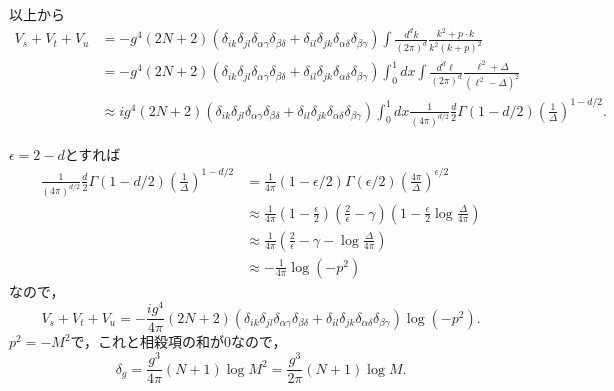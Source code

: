 以上から
\begin{align*}
  V_s + V_t + V_u &= - g^4 (2N+2) \left( \delta_{ik} \delta_{jl} \delta_{\alpha\gamma} \delta_{\beta\delta} + \delta_{il} \delta_{jk} \delta_{\alpha\delta} \delta_{\beta\gamma} \right)
  \int \frac{d^dk}{(2\pi)^d} \frac{k^2 + p \cdot k}{k^2(k+p)^2} \\
  &= - g^4 (2N+2) \left( \delta_{ik} \delta_{jl} \delta_{\alpha\gamma} \delta_{\beta\delta} + \delta_{il} \delta_{jk} \delta_{\alpha\delta} \delta_{\beta\gamma} \right)
  \int_0^1 dx \int \frac{d^d\ell}{(2\pi)^d} \frac{\ell^2 + \Delta}{(\ell^2 - \Delta)^2} \\
  &\approx ig^4 (2N+2) \left( \delta_{ik} \delta_{jl} \delta_{\alpha\gamma} \delta_{\beta\delta} + \delta_{il} \delta_{jk} \delta_{\alpha\delta} \delta_{\beta\gamma} \right)
  \int_0^1 dx \frac{1}{(4\pi)^{d/2}} \frac{d}{2} \Gamma(1-d/2) \left( \frac{1}{\Delta} \right)^{1-d/2} .
\end{align*}

$\epsilon = 2-d$とすれば
\begin{align*}
  \frac{1}{(4\pi)^{d/2}} \frac{d}{2} \Gamma(1-d/2) \left( \frac{1}{\Delta} \right)^{1-d/2}
  &= \frac{1}{4\pi} (1-\epsilon/2) \Gamma(\epsilon/2) \left( \frac{4\pi}{\Delta} \right)^{\epsilon/2} \\
  &\approx \frac{1}{4\pi} \left( 1 - \frac{\epsilon}{2} \right) \left( \frac{2}{\epsilon} - \gamma \right) \left( 1 - \frac{\epsilon}{2} \log\frac{\Delta}{4\pi} \right) \\
  &\approx \frac{1}{4\pi} \left( \frac{2}{\epsilon} - \gamma - \log\frac{\Delta}{4\pi} \right) \\
  &\approx - \frac{1}{4\pi} \log(-p^2)
\end{align*}
なので，
\[
  V_s + V_t + V_u = - \frac{ig^4}{4\pi} (2N+2) \left( \delta_{ik} \delta_{jl} \delta_{\alpha\gamma} \delta_{\beta\delta} + \delta_{il} \delta_{jk} \delta_{\alpha\delta} \delta_{\beta\gamma} \right) \log(-p^2)  .
\]
$p^2 = -M^2$で，これと相殺項の和が$0$なので，
\[ \delta_g = \frac{g^3}{4\pi} (N+1) \log M^2 =  \frac{g^3}{2\pi} (N+1) \log M . \]

